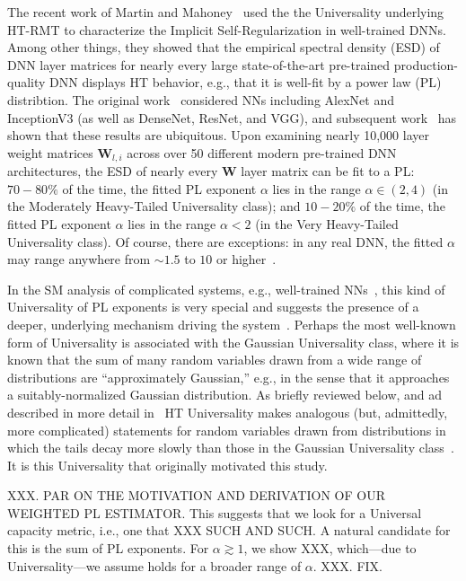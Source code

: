 The recent work of Martin and Mahoney~\cite{MM18_TR} used the the Universality underlying HT-RMT to characterize the Implicit Self-Regularization in well-trained DNNs.
Among other things, they showed that the empirical spectral density (ESD) of DNN layer matrices for nearly every large state-of-the-art pre-trained production-quality DNN displays HT behavior, e.g., that it is well-fit by a power law (PL) distribtion.
%
The original work~\cite{MM18_TR} considered 
NNs including AlexNet and InceptionV3 (as well as DenseNet, ResNet, and VGG),
and subsequent work~\cite{MM18_unpub_work} has shown that these results are ubiquitous. 
Upon examining nearly 10,000 layer weight matrices $\mathbf{W}_{l,i}$ across over 50 different modern pre-trained DNN architectures, the ESD of nearly every $\mathbf{W}$ layer matrix can be fit to a PL:
$70-80\%$ of the time, the fitted PL exponent $\alpha$ lies in the range $\alpha\in(2,4)$ (in the Moderately Heavy-Tailed Universality class); and
$10-20\%$ of the time, the fitted PL exponent $\alpha$ lies in the range $\alpha< 2$ (in the Very Heavy-Tailed Universality class).
Of course, there are exceptions: in any real DNN, the fitted $\alpha$ may range anywhere from $\sim 1.5$ to $10$ or higher~\cite{MM18_unpub_work}.  

In the SM analysis of complicated systems, e.g., well-trained NNs~\cite{EB01_BOOK,nishimori01}, this kind of Universality of PL exponents is very special and suggests the presence of a deeper, underlying mechanism driving the system~\cite{SornetteBook,BouchaudPotters03}. 
Perhaps the most well-known form of Universality is associated with the Gaussian Universality class, where it is known that the sum of many random variables drawn from a wide range of distributions are ``approximately Gaussian,'' e.g., in the sense that it approaches a suitably-normalized Gaussian distribution.
As briefly reviewed below, and ad described in more detail in~\cite{MM18_TR} HT Universality makes analogous (but, admittedly, more complicated) statements for random variables drawn from distributions in which the tails decay more slowly than those in the Gaussian Universality class~\cite{XXX-XXX,XXX-XXX}.
It is this Universality that originally motivated this study.

XXX.  PAR ON THE MOTIVATION AND DERIVATION OF OUR WEIGHTED PL ESTIMATOR.
This suggests that we look for a Universal capacity metric, i.e., one that XXX SUCH AND SUCH.
A natural candidate for this is the sum of PL exponents.
For $\alpha \gtrsim 1$, we show XXX, which---due to Universality---we assume holds for a broader range of $\alpha$.
XXX.  FIX.

